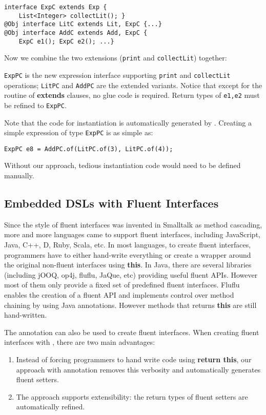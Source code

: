 \begin{lstlisting}[]
interface ExpC extends Exp {
    List<Integer> collectLit(); }
@Obj interface LitC extends Lit, ExpC {...}
@Obj interface AddC extends Add, ExpC {
    ExpC e1(); ExpC e2(); ...}
\end{lstlisting}

\noindent Now we combine the two extensions (\texttt{print} and
\texttt{collectLit}) together:



\noindent \texttt{ExpPC} is the new expression interface supporting
\texttt{print} and \texttt{collectLit} operations; \texttt{LitPC} and
\texttt{AddPC} are the extended variants. Notice that except for the routine of
\textbf{extends} clauses, no glue code is required. Return types of
\texttt{e1,e2} must be refined to \texttt{ExpPC}.

Note that the code for instantiation is automatically generated by \mixin.
Creating a simple expression of type \texttt{ExpPC} is
as simple as:
\begin{lstlisting}
ExpPC e8 = AddPC.of(LitPC.of(3), LitPC.of(4));
\end{lstlisting}
\noindent Without our approach, tedious instantiation code would need
to be defined manually.

\subsection{Embedded DSLs with Fluent Interfaces}\label{sec:dsls}
Since the style of fluent interfaces was invented in Smalltalk as method
cascading, more and more languages came to support fluent interfaces, including
JavaScript, Java, C++, D, Ruby, Scala, etc. In most languages, to create fluent
interfaces, programmers have to either hand-write everything or create a wrapper
around the original non-fluent interfaces using \textbf{this}. In Java, there
are several libraries (including jOOQ, op4j, fluflu, JaQue, etc) providing useful
fluent APIs. However most of them only provide a fixed set of predefined fluent
interfaces. Fluflu enables the creation of a fluent API and implements control
over method chaining by using Java annotations. However methods that returns
\textbf{this} are still hand-written.

The \mixin annotation can also be used to create fluent interfaces.  When
creating fluent interfaces with \mixin, there are two main advantages:
\begin{enumerate}
\item Instead of forcing programmers to hand write code using \textbf{return
    this}, our approach with \mixin annotation removes this verbosity and
  automatically generates fluent setters.
\item The approach supports extensibility: the return types of fluent setters are
  automatically refined.
\end{enumerate}


